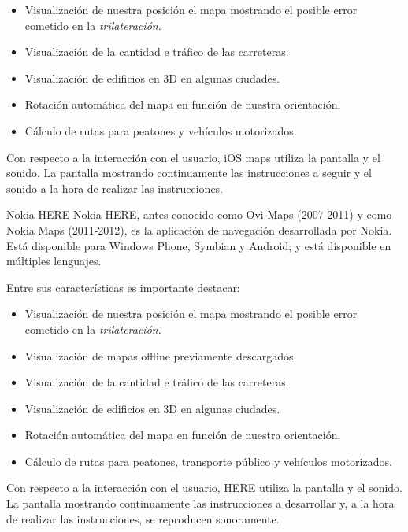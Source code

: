 \begin{definitionlist}
    \begin{itemize}
      \item Visualización de nuestra posición el mapa mostrando el posible error cometido en la
        \emph{trilateración}.
      \item Visualización de la cantidad e tráfico de las carreteras.
      \item Visualización de edificios en 3D en algunas ciudades.
      \item Rotación automática del mapa en función de nuestra orientación.
      \item Cálculo de rutas para peatones y vehículos motorizados.
    \end{itemize}

    Con respecto a la interacción con el usuario, iOS maps utiliza la pantalla y el sonido. La
    pantalla mostrando continuamente las instrucciones a seguir y el sonido a la hora de realizar
    las instrucciones.

  \item[Nokia HERE] Nokia HERE, antes conocido como Ovi Maps (2007-2011) y como Nokia Maps
    (2011-2012), es la aplicación de navegación desarrollada por Nokia. Está disponible para Windows
    Phone, Symbian y Android; y está disponible en múltiples lenguajes.

    Entre sus características es importante destacar:

    \begin{itemize}
      \item Visualización de nuestra posición el mapa mostrando el posible error cometido en la
        \emph{trilateración}.
      \item Visualización de mapas offline previamente descargados.
      \item Visualización de la cantidad e tráfico de las carreteras.
      \item Visualización de edificios en 3D en algunas ciudades.
      \item Rotación automática del mapa en función de nuestra orientación.
      \item Cálculo de rutas para peatones, transporte público y vehículos motorizados.
    \end{itemize}

    Con respecto a la interacción con el usuario, HERE utiliza la pantalla y el sonido. La
    pantalla mostrando continuamente las instrucciones a desarrollar y, a la hora de realizar
    las instrucciones, se reproducen sonoramente.


\end{definitionlist}
